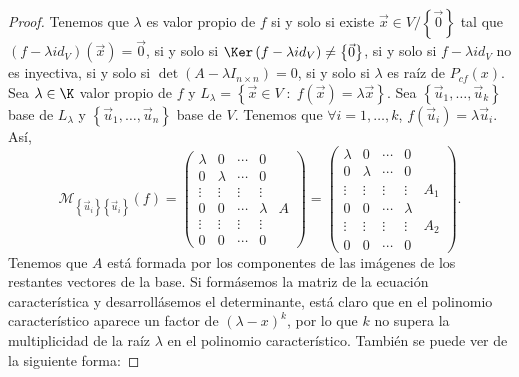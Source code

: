 \begin{proof}
	Tenemos que $\displaystyle \lambda  $ es valor propio de $\displaystyle f $ si y solo si existe $\displaystyle \vec{x} \in V/ \left\{ \vec{0}\right\}  $ tal que $\displaystyle \left(f - \lambda id _{V}\right)\left(\vec{x}\right) = \vec{0} $, si y solo si $\displaystyle \Ker\left(f - \lambda id _{V}\right) \neq \left\{ \vec{0}\right\}  $, si y solo si $\displaystyle f - \lambda id _{V} $ no es inyectiva, si y solo si $\displaystyle \det\left(A - \lambda I_{n \times n}\right) = 0 $, si y solo si $\displaystyle \lambda  $ es raíz de $\displaystyle P_{cf}\left(x\right) $.
	Sea $\displaystyle \lambda \in \K $ valor propio de $\displaystyle f $ y $\displaystyle L_{\lambda } = \left\{ \vec{x} \in V \; : \; f\left(\vec{x}\right) = \lambda \vec{x}\right\}  $. Sea $\displaystyle \left\{ \vec{u}_{1}, \ldots, \vec{u}_{k}\right\}  $ base de $\displaystyle L_{\lambda } $ y $\displaystyle \left\{ \vec{u}_{1}, \ldots, \vec{u}_{n}\right\}  $ base de $\displaystyle V $.
Tenemos que $\displaystyle \forall i = 1, \ldots, k $, $\displaystyle f\left(\vec{u}_{i}\right) = \lambda \vec{u}_{i} $. Así,
\[
	\mathcal{M}_{ \left\{ \vec{u}_{i}\right\} \left\{ \vec{u}_{i}\right\} }\left(f\right) = 
	\begin{pmatrix} \lambda & 0 & \cdots & 0\\
	0 & \lambda & \cdots & 0 \\
\vdots & \vdots & \vdots & \vdots \\
0 & 0 & \cdots & \lambda  & A\\
\vdots & \vdots & \vdots & \vdots \\
0 & 0 & \cdots & 0\end{pmatrix} = \begin{pmatrix} \lambda & 0 & \cdots & 0\\
	0 & \lambda & \cdots & 0 \\
	\vdots & \vdots & \vdots & \vdots & A_{1} \\
0 & 0 & \cdots & \lambda  \\
\vdots & \vdots & \vdots & \vdots & A_{2} \\
0 & 0 & \cdots & 0\end{pmatrix}
.\]
Tenemos que $\displaystyle A $ está formada por los componentes de las imágenes de los restantes vectores de la base. Si formásemos la matriz de la ecuación característica y desarrollásemos el determinante, está claro que en el polinomio característico aparece un factor de $\displaystyle \left(\lambda - x\right)^{k} $, por lo que $\displaystyle k $ no supera la multiplicidad de la raíz $\displaystyle \lambda  $ en el polinomio característico. También se puede ver de la siguiente forma:

\end{proof}
